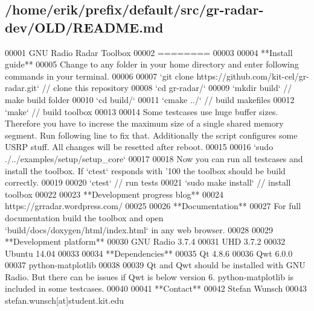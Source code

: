 \subsection{/home/erik/prefix/default/src/gr-\/radar-\/dev/\+O\+L\+D/\+R\+E\+A\+D\+ME.md}

\begin{DoxyCode}
00001 GNU Radio Radar Toolbox
00002 ========
00003 
00004 **Install guide**  
00005 Change to any folder in your home directory and enter following commands in your terminal.
00006 
00007 `git clone https://github.com/kit-cel/gr-radar.git` // clone this repository  
00008 `cd gr-radar/`  
00009 `mkdir build` // make build folder  
00010 `cd build/`  
00011 `cmake ../` // build makefiles  
00012 `make` // build toolbox 
00013 
00014 Some testcases use huge buffer sizes. Therefore you have to increse the maximum size of a single
       shared memory segment. Run following line to fix that. Additionally the script configures some USRP stuff. All
       changes will be resetted after reboot.
00015 
00016 `sudo ./../examples/setup/setup\_core`
00017 
00018 Now you can run all testcases and install the toolbox. If `ctest` responds with '100%
       the toolbox should be build correctly.
00019 
00020 `ctest` // run tests  
00021 `sudo make install` // install toolbox
00022 
00023 **Development progress blog**  
00024 https://grradar.wordpress.com/
00025 
00026 **Documentation**  
00027 For full documentation build the toolbox and open `build/docs/doxygen/html/index.html` in any web
       browser.
00028 
00029 **Development platform**  
00030 GNU Radio 3.7.4  
00031 UHD 3.7.2  
00032 Ubuntu 14.04
00033 
00034 **Dependencies**  
00035 Qt 4.8.6  
00036 Qwt 6.0.0  
00037 python-matplotlib  
00038 
00039 Qt and Qwt should be installed with GNU Radio. But there can be issues if Qwt is below version 6.
       python-matplotlib is included in some testcases.
00040 
00041 **Contact**  
00042 Stefan Wunsch  
00043 stefan.wunsch[at]student.kit.edu
\end{DoxyCode}
